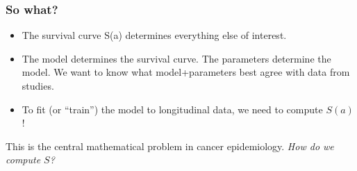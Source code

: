 \documentclass{beamer}
\begin{document}
\begin{frame}
    \frametitle{So what?}

    \begin{itemize}
        \item The survival curve S(a) determines everything else of interest.
        \item The model determines the survival curve. The parameters determine
        the model. We want to know what model+parameters best agree with
        data from studies.
        \item To fit (or ``train'') the model to longitudinal data, we need to compute $S(a)$!
    \end{itemize}

    \;

    This is the central mathematical problem in cancer epidemiology. \emph{How do we compute $S$?}
\end{frame}
\end{document}
